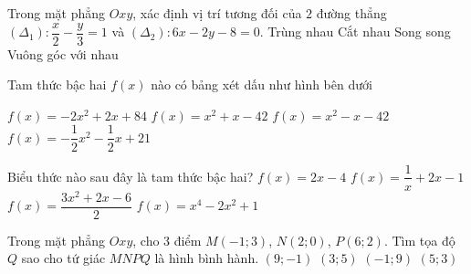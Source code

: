 \begin{ex}%
	Trong mặt phẳng $Oxy$, xác định vị trí tương đối của $2$ đường thẳng $\left(\Delta_1\right)\colon \dfrac{x}{2} - \dfrac{y}{3}=1$ và $\left(\Delta_2\right)\colon 6x-2y-8=0$.
	\choice
	{Trùng nhau}
	{\True Cắt nhau}
	{Song song}
	{Vuông góc với nhau}
\end{ex}

\begin{ex}%
	Tam thức bậc hai $f(x)$ nào có bảng xét dấu như hình bên dưới
	\begin{center}
	\end{center}
	\choice
	{$f(x) = -2x^2 + 2x + 84$}
	{$f(x) = x^2 + x -42$}
	{$f(x) = x^2 - x -42$}
	{\True $f(x) = -\dfrac{1}{2}x^2 - \dfrac{1}{2}x + 21$}
\end{ex}

\begin{ex}%
	Biểu thức nào sau đây là tam thức bậc hai?
	\choice
	{$f(x) = 2x - 4$}
	{$f(x) = \dfrac{1}{x} + 2x - 1$}
	{\True $f(x) = \dfrac{3x^2 + 2x - 6}{2}$}
	{$f(x) = x^4 - 2x^2 + 1$}
\end{ex}

\begin{ex}%
	Trong mặt phẳng $Oxy$, cho $3$ điểm $M(-1;3)$, $N(2;0)$, $P(6;2)$. Tìm tọa độ $Q$ sao cho tứ giác $MNPQ$ là hình bình hành.
	\choice
	{$(9;-1)$}
	{\True $(3;5)$}
	{$(-1;9)$}
	{$(5;3)$}
\end{ex}


